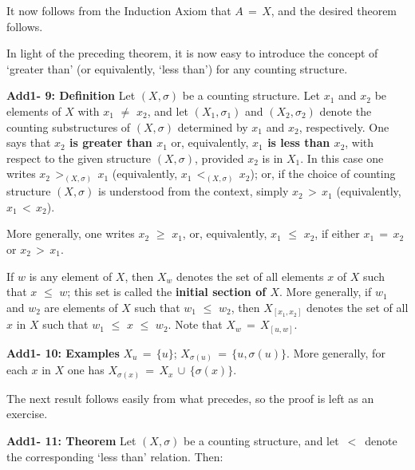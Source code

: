 {        It now follows from the Induction Axiom that $A \,=\, X$, and the desired theorem follows.

\V
\V

        In light of the preceding theorem, it is now easy to introduce the concept of `greater than' (or equivalently, `less than') for any counting structure.

\V

        {\bf Add1- 9: Definition} Let $(X,{\sigma})$ be a counting structure. Let $x_{1}$ and $x_{2}$ be elements of $X$ with $x_{1} \,\,{\neq}\,\, x_{2}$,
    and let $(X_{1},{\sigma}_{1})$ and $(X_{2},{\sigma}_{2})$ denote the counting substructures of $(X,{\sigma})$ determined by $x_{1}$ and $x_{2}$, respectively.
    One says that {\bf $x_{2}$ is greater than $x_{1}$} or, equivalently, {\bf $x_{1}$ is less than $x_{2}$}, with respect to the given structure $(X,{\sigma})$, provided $x_{2}$ is in $X_{1}$.
    In this case one writes $x_{2}\,>_{(X,{\sigma})}\,x_{1}$ (equivalently, $x_{1}\,<_{(X,{\sigma})}\,x_{2}$);
    or, if the choice of counting structure $(X,{\sigma})$ is understood from the context, simply $x_{2}\,>\,x_{1}$ (equivalently, $x_{1}\,<\,x_{2}$).

        More generally, one writes $x_{2}\,\,{\geq}\,\,x_{1}$, or, equivalently, $x_{1}\,\,{\leq}\,\,x_{2}$, if either $x_{1} \,=\, x_{2}$ or $x_{2}\,>\,x_{1}$.

        If $w$ is any element of $X$, then $X_{w}$ denotes the set of all elements $x$ of $X$ such that $x\,\,{\leq}\,\,w$;
    this set is called the {\bf initial section of $X$}.
    More generally, if $w_{1}$ and $w_{2}$ are elements of $X$ such that $w_{1}\,\,{\leq}\,\,w_{2}$,
    then $X_{[x_{1},x_{2}]}$ denotes the set of all $x$ in $X$ such that $w_{1}\,\,{\leq}\,\,x\,\,{\leq}\,\,w_{2}$.
    Note that $X_{w} \,=\, X_{[u,w]}$.

\V

        {\bf Add1- 10: Examples} $X_{u} \,=\, \{u\}$; $X_{{\sigma}(u)} \,=\, \{u,{\sigma}(u)\}$.
    More generally, for each $x$ in $X$ one has $X_{{\sigma}(x)} \,=\, X_{x}\,{\cup}\,\{{\sigma}(x)\}$.

\V

        The next result follows easily from what precedes, so the proof is left as an exercise.

\V

        {\bf Add1- 11: Theorem} Let $(X,{\sigma})$ be a counting structure, and let $\,<\,$ denote the corresponding `less than' relation.
    Then:

}
